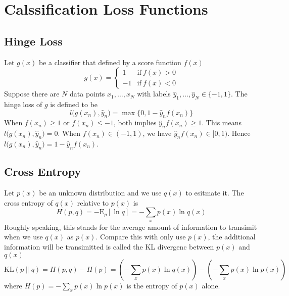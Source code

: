\documentclass[../main.tex]{subfiles}
\begin{document}
    \section{Calssification Loss Functions}
        \subsection{Hinge Loss}
            Let $g(x)$ be a classifier that defined by a score function $f(x)$
            \[
                g(x) = \left\{ 
                         \begin{array}{rl}
                            1 & \mathrm{if~} f(x) > 0\\
                            -1 & \mathrm{if~} f(x) < 0
                         \end{array}
                       \right.
            \]
            Suppose there are $N$ data points $x_1,\dots,x_N$ with labels $\hat{y}_1,\dots,\hat{y}_N \in \{ -1, 1 \}$. The hinge loss of $g$ is defined to be
            \[
                l\big( g(x_n),\hat{y}_n \big) = \max\{ 0, 1 - \hat{y}_n f(x_n) \}
            \]
            When $f(x_n) \geq 1$ or $f(x_n) \leq -1$, both implies $\hat{y}_n f(x_n) \geq 1$. This means $l\big( g(x_n), \hat{y}_n \big) = 0$.
            When $f(x_n) \in (-1, 1)$, we have $\hat{y}_n f(x_n)\in [0, 1)$. Hence $l\big( g(x_n), \hat{y}_n \big) = 1 - \hat{y}_n f(x_n)$.
        \subsection{Cross Entropy}
            Let $p(x)$ be an unknown distribution and we use $q(x)$ to esitmate it. The cross entropy of $q(x)$ relative to $p(x)$ is
            \[
                H(p,q) = -\mathrm{E}_p[\ln q] = - \sum_x p(x) \ln q(x)
            \]
            Roughly speaking, this stands for the average amount of information to transimit when we use $q(x)$ as $p(x)$. Compare this with only use $p(x)$,
            the additional information will be transimitted is called the KL divergenc between $p(x)$ and $q(x)$
            \[
                \mathrm{KL}(p \| q) = H(p,q) - H(p) = \left( -\sum_x p(x) \ln q(x) \right) - \left( -\sum_x p(x) \ln p(x) \right)
            \]
            where $H(p)=-\sum_x p(x) \ln p(x)$ is the entropy of $p(x)$ alone.
\end{document}
